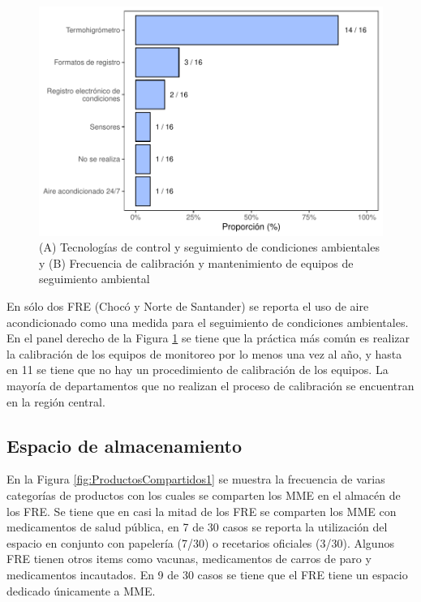 \documentclass[
]{book}
\begin{document}
\begin{figure}[t]
\includegraphics[width=1\linewidth]{InformeFinal_files/figure-latex/MetodosSeguimientoControlAmbiental-1} \caption{(A) Tecnologías de control y seguimiento de condiciones ambientales y (B) Frecuencia de calibración y mantenimiento de equipos de seguimiento ambiental}\label{fig:MetodosSeguimientoControlAmbiental}
\end{figure}

En sólo dos FRE (Chocó y Norte de Santander) se reporta el uso de aire acondicionado como una medida para el seguimiento de condiciones ambientales. En el panel derecho de la Figura \ref{fig:MetodosSeguimientoControlAmbiental} se tiene que la práctica más común es realizar la calibración de los equipos de monitoreo por lo menos una vez al año, y hasta en 11 se tiene que no hay un procedimiento de calibración de los equipos. La mayoría de departamentos que no realizan el proceso de calibración se encuentran en la región central.

\hypertarget{espacio-de-almacenamiento}{%
\subsection{Espacio de almacenamiento}\label{espacio-de-almacenamiento}}

En la Figura \ref{fig:ProductosCompartidos1} se muestra la frecuencia de varias categorías de productos con los cuales se comparten los MME en el almacén de los FRE. Se tiene que en casi la mitad de los FRE se comparten los MME con medicamentos de salud pública, en 7 de 30 casos se reporta la utilización del espacio en conjunto con papelería (7/30) o recetarios oficiales (3/30). Algunos FRE tienen otros items como vacunas, medicamentos de carros de paro y medicamentos incautados. En 9 de 30 casos se tiene que el FRE tiene un espacio dedicado únicamente a MME.
\end{document}
